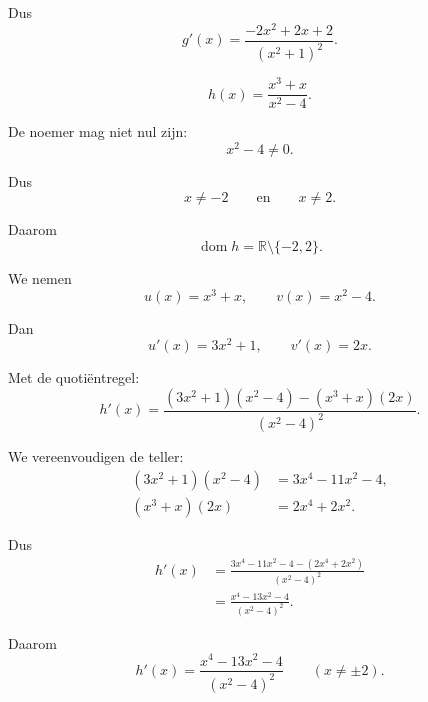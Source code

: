 \documentclass{ximera}
\begin{document}
\begin{oefening}[Quotiëntregel]{\oefB\ESS}
\begin{question}
\begin{oplossing}
  Dus
  \[
  \boxed{
  g'(x)=\frac{-2x^2+2x+2}{(x^2+1)^2}
  }.
  \]
  \end{oplossing}
  
  \end{question}
  
  
  \begin{question}
  
  \[
  h(x)=\frac{x^3+x}{x^2-4}.
  \]
  
  \begin{oplossing}
  De noemer mag niet nul zijn:
  \[
  x^2-4\neq0.
  \]
  
  Dus
  \[
  x\neq-2
  \qquad\text{en}\qquad
  x\neq2.
  \]
  
  Daarom
  \[
  \boxed{
  \operatorname{dom}h=\mathbb{R}\setminus\{-2,2\}
  }.
  \]
  
  We nemen
  \[
  u(x)=x^3+x,
  \qquad
  v(x)=x^2-4.
  \]
  
  Dan
  \[
  u'(x)=3x^2+1,
  \qquad
  v'(x)=2x.
  \]
  
  Met de quotiëntregel:
  \[
  h'(x)
  =
  \frac{
  (3x^2+1)(x^2-4)-(x^3+x)(2x)
  }{
  (x^2-4)^2
  }.
  \]
  
  We vereenvoudigen de teller:
  \[
  \begin{aligned}
  (3x^2+1)(x^2-4)
  &=3x^4-11x^2-4,\\
  (x^3+x)(2x)
  &=2x^4+2x^2.
  \end{aligned}
  \]
  
  Dus
  \[
  \begin{aligned}
  h'(x)
  &=
  \frac{
  3x^4-11x^2-4-(2x^4+2x^2)
  }{
  (x^2-4)^2
  }\\
  &=
  \frac{x^4-13x^2-4}{(x^2-4)^2}.
  \end{aligned}
  \]
  
  Daarom
  \[
  \boxed{
  h'(x)=\frac{x^4-13x^2-4}{(x^2-4)^2}
  }
  \qquad (x\neq\pm2).
  \]
  \end{oplossing}
  
  \end{question}
  
  \end{oefening}
  
  
  
\end{document}
